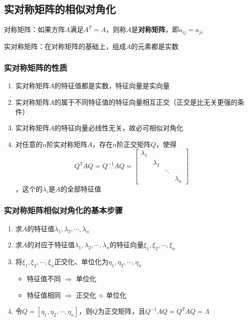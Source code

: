 \documentclass[./linear_algebra.tex]{subfiles}
\begin{document}
    \subsection{实对称矩阵的相似对角化}

    对称矩阵：如果方阵$A$满足$A^T = A$，则称$A$是\textbf{对称矩阵}，即$a_{ij} = a_{ji}$

    \noindent
    实对称矩阵：在对称矩阵的基础上，组成$A$的元素都是实数

    \subsubsection{实对称矩阵的性质}

    \begin{enumerate}
        \item 实对称矩阵$A$的特征值都是实数，特征向量是实向量
        \item 实对称矩阵$A$的属于不同特征值的特征向量相互正交（正交是比无关更强的条件）
        \item 实对称矩阵$A$的特征向量必线性无关，故必可相似对角化
        \item 对任意的$n$阶实对称矩阵$A$，存在$n$阶正交矩阵$Q$，使得
        \[
            Q^{T}AQ = Q^{-1}AQ = \begin{bmatrix}
                                     \lambda_1 &&& \\
                                     & \lambda_2 &&\\
                                     &&\ddots & \\
                                     &&&\lambda_n
            \end{bmatrix}
        \]，这个的$\lambda_i$是$A$的全部特征值
    \end{enumerate}

    \subsubsection{实对称矩阵相似对角化的基本步骤}

    \begin{enumerate}
        \item 求$A$的特征值$\lambda_1, \lambda_2, \cdots, \lambda_n$
        \item 求$A$的对应于特征值$\lambda_1, \lambda_2, \cdots, \lambda_n$的特征向量$\xi_1, \xi_2, \cdots, \xi_n$
        \item 将$\xi_1, \xi_2, \cdots, \xi_n$正交化、单位化为$\eta_1, \eta_2, \cdots, \eta_n$
        \begin{itemize}
            \item 特征值不同 $\Rightarrow$ 单位化
            \item 特征值相同 $\Rightarrow$ 正交化 + 单位化
        \end{itemize}
        \item 令$Q = [\eta_1, \eta_2, \cdots, \eta_n]$，则$Q$为正交矩阵，且$Q^{-1}AQ = Q^{T}AQ = \Lambda$
    \end{enumerate}
\end{document}
